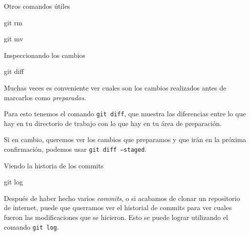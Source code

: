 \begin{frame}[t]{Otros comandos útiles}
    \begin{comando}
        git rm
    \end{comando}


    \vspace{2em}

    \begin{comando}
        git mv
    \end{comando}

\end{frame}

\begin{frame}[t]{Inspeccionando los cambios}
    \begin{comando}
        git diff
    \end{comando}

    \pause
    \begin{block}{}
        Muchas veces es conveniente ver cuales son los cambios realizados antes de marcarlos como \textit{preparados}.

        Para esto tenemos el comando \texttt{git diff}, que muestra las diferencias entre lo que hay en
        tu directorio de trabajo con lo que hay en tu área de preparación.

        \vspace{1em}

        Si en cambio, queremos ver los cambios que preparamos y que irán en la próxima confirmación, podemos usar \texttt{git diff --staged}.
    \end{block}
\end{frame}

\begin{frame}[t]{Viendo la historia de los commits}
    \begin{comando}
        git log
    \end{comando}

    \pause
    \begin{block}{}
        Después de haber hecho varios \textit{commits}, o si acabamos de clonar un repositorio
        de internet, puede que querramos ver el historial de commits para ver cuales
        fueron las modificaciones que se hicieron. Esto se puede lograr utilizando el
        comando \texttt{git log}.
    \end{block}
\end{frame}

